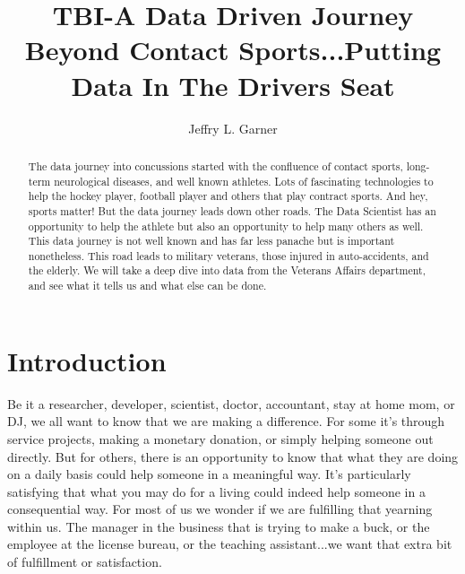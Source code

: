 \documentclass[sigconf]{acmart}
\begin{document}
\title{TBI-A Data Driven Journey Beyond Contact Sports...Putting Data In The Drivers Seat}



\author{Jeffry L. Garner}

\begin{abstract}

The data journey into concussions started with the confluence of contact sports, long-term neurological diseases, and well known athletes.  Lots of fascinating technologies to help the hockey player, football player and others that play contract sports.  And hey, sports matter!  But the data journey leads down other roads.  The Data Scientist has an opportunity to help the athlete but also an opportunity to help many others as well.  This data journey is not well known and has far less panache but is important nonetheless.  This road leads to military veterans, those injured in auto-accidents, and the elderly.  We will take a deep dive into data from the Veterans Affairs department, and see what it tells us and what else can be done. 

\end{abstract}



\maketitle

\section{Introduction}

Be it a researcher, developer, scientist, doctor, accountant, stay at home mom, or DJ, we all want to know that we are making a difference.  For some it's through service projects, making a monetary donation, or simply helping someone out directly.  But for others, there is an opportunity to know that what they are doing on a daily basis could help someone in a meaningful way.  It's particularly satisfying that what you may do for a living could indeed help someone in a consequential way.   For most of us we wonder if we are fulfilling that yearning within us.  The manager in the business that is trying to make a buck, or the employee at the license bureau, or the teaching assistant...we want that extra bit of fulfillment or satisfaction.
\end{document}
